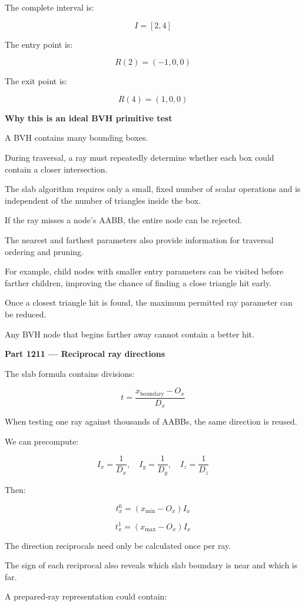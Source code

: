 The complete interval is:

\[
\boxed{I=[2,4]}
\]

The entry point is:

\[
R(2)=(-1,0,0)
\]

The exit point is:

\[
R(4)=(1,0,0)
\]

\textbf{Why this is an ideal BVH primitive test}

A BVH contains many bounding boxes.

During traversal, a ray must repeatedly determine whether each box could contain a closer intersection.

The slab algorithm requires only a small, fixed number of scalar operations and is independent of the number of triangles inside the box.

If the ray misses a node's AABB, the entire node can be rejected.

The nearest and farthest parameters also provide information for traversal ordering and pruning.

For example, child nodes with smaller entry parameters can be visited before farther children, improving the chance of finding a close triangle hit early.

Once a closest triangle hit is found, the maximum permitted ray parameter can be reduced.

Any BVH node that begins farther away cannot contain a better hit.

\textbf{Part 1211 --- Reciprocal ray directions}

The slab formula contains divisions:

\[
t=\frac{x_{\mathrm{boundary}}-O_x}{D_x}
\]

When testing one ray against thousands of AABBs, the same direction is reused.

We can precompute:

\[
\boxed{ I_x=\frac1{D_x},\quad I_y=\frac1{D_y},\quad I_z=\frac1{D_z} }
\]

Then:

\[
t_x^0=(x_{\min}-O_x)I_x
\]

\[
t_x^1=(x_{\max}-O_x)I_x
\]

The direction reciprocals need only be calculated once per ray.

The sign of each reciprocal also reveals which slab boundary is near and which is far.

A prepared-ray representation could contain:

